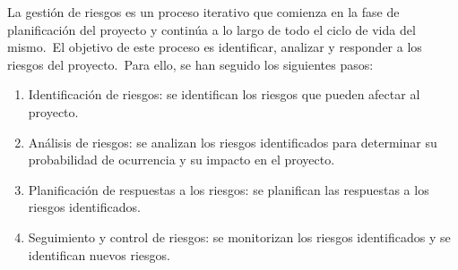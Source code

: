 
La gestión de riesgos es un proceso iterativo que comienza en la fase de planificación del proyecto y continúa a lo
largo de todo el ciclo de vida del mismo.\ El objetivo de este proceso es identificar, analizar y responder a los
riesgos del proyecto.\ Para ello, se han seguido los siguientes pasos:

\begin{enumerate}
	\item Identificación de riesgos: se identifican los riesgos que pueden afectar al proyecto.
	\item Análisis de riesgos: se analizan los riesgos identificados para determinar su probabilidad de ocurrencia y su
	impacto en el proyecto.
	\item Planificación de respuestas a los riesgos: se planifican las respuestas a los riesgos identificados.
	\item Seguimiento y control de riesgos: se monitorizan los riesgos identificados y se identifican nuevos riesgos.
\end{enumerate}
\label{itm:riesgos_pasos}



